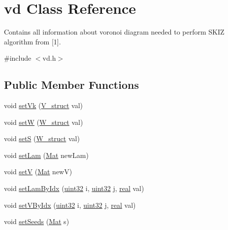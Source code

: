 \hypertarget{classvd}{}\section{vd Class Reference}
\label{classvd}


Contains all information about voronoi diagram needed to perform S\+K\+IZ algorithm from \mbox{[}1\mbox{]}.  




{\ttfamily \#include $<$vd.\+h$>$}

\subsection*{Public Member Functions}
\begin{DoxyCompactItemize}
\item 
void \mbox{\hyperlink{classvd_a062d265bd642352d6f7e8cc8685ed7a8}{set\+Vk}} (\mbox{\hyperlink{structV__struct}{V\+\_\+struct}} val)
\item 
void \mbox{\hyperlink{classvd_a85ee3a096c181f76d15f4b7fcf137fe7}{setW}} (\mbox{\hyperlink{structW__struct}{W\+\_\+struct}} val)
\item 
void \mbox{\hyperlink{classvd_a0b4c53a592ec499899a37c2e6364806a}{setS}} (\mbox{\hyperlink{structW__struct}{W\+\_\+struct}} val)
\item 
void \mbox{\hyperlink{classvd_ae13e9e465d08425218bd8f85ce420c05}{set\+Lam}} (\mbox{\hyperlink{typedefs_8h_a9fa28c1f74e909474857584f5c7b0088}{Mat}} new\+Lam)
\item 
void \mbox{\hyperlink{classvd_a33e792915ebd0295a3475fe686b41ee9}{setV}} (\mbox{\hyperlink{typedefs_8h_a9fa28c1f74e909474857584f5c7b0088}{Mat}} newV)
\item 
void \mbox{\hyperlink{classvd_a8df228a05762e0c0a2bccc28094a1f92}{set\+Lam\+By\+Idx}} (\mbox{\hyperlink{typedefs_8h_a8ad23e2333787a214e20a58a284a5a60}{uint32}} i, \mbox{\hyperlink{typedefs_8h_a8ad23e2333787a214e20a58a284a5a60}{uint32}} j, \mbox{\hyperlink{typedefs_8h_a58a0c7cf2501f4492da833421be92547}{real}} val)
\item 
void \mbox{\hyperlink{classvd_a29670919bb8d5b2f2f0235ddfda6484e}{set\+V\+By\+Idx}} (\mbox{\hyperlink{typedefs_8h_a8ad23e2333787a214e20a58a284a5a60}{uint32}} i, \mbox{\hyperlink{typedefs_8h_a8ad23e2333787a214e20a58a284a5a60}{uint32}} j, \mbox{\hyperlink{typedefs_8h_a58a0c7cf2501f4492da833421be92547}{real}} val)
\item 
void \mbox{\hyperlink{classvd_a739318bbb45d4facfcc1899c71b91720}{set\+Seeds}} (\mbox{\hyperlink{typedefs_8h_a9fa28c1f74e909474857584f5c7b0088}{Mat}} s)

\end{DoxyCompactItemize}
